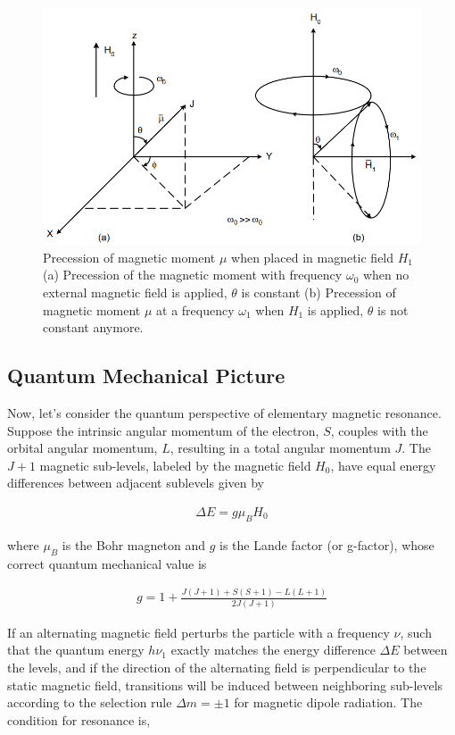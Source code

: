 \begin{figure}[H]
    \centering
    \includegraphics[width=1\columnwidth]{images/f1.png}
    \caption{Precession of magnetic moment $\mu$ when
    placed in magnetic field $H_1$ (a) Precession of the magnetic moment with frequency $\omega_0$ when no external
    magnetic field is applied, $\theta$ is constant (b) Precession
    of magnetic moment $\mu$ at a frequency $\omega_1$ when $H_1$ is
    applied, $\theta$ is not constant anymore.}
    \label{f1}
\end{figure}

\subsection*{Quantum Mechanical Picture}

Now, let's consider the quantum perspective of elementary magnetic resonance. Suppose the intrinsic
angular momentum of the electron, $S$, couples with
the orbital angular momentum, $L$, resulting in a total angular momentum $J$. The $J + 1$ magnetic sub-levels, labeled by the magnetic field $H_0$, have equal
energy differences between adjacent sublevels given
by

\begin{align}
    \Delta E = g\mu_B H_0
\end{align}

where $\mu_B$ is the Bohr magneton and $g$ is the Lande factor (or g-factor), whose correct quantum mechanical
value is

\begin{align}
    g = 1 + \frac{J(J+1)+S(S+1)-L(L+1)}{2J(J+1)}
\end{align}

If an alternating magnetic field perturbs the particle
with a frequency $\nu$, such that the quantum energy
$h\nu_1$ exactly matches the energy difference $\Delta E$ between the levels, and if the direction of the alternating field is perpendicular to the static magnetic field,
transitions will be induced between neighboring sub-levels according to the selection rule $\Delta m = \pm 1$ for
magnetic dipole radiation. The condition for resonance is,

